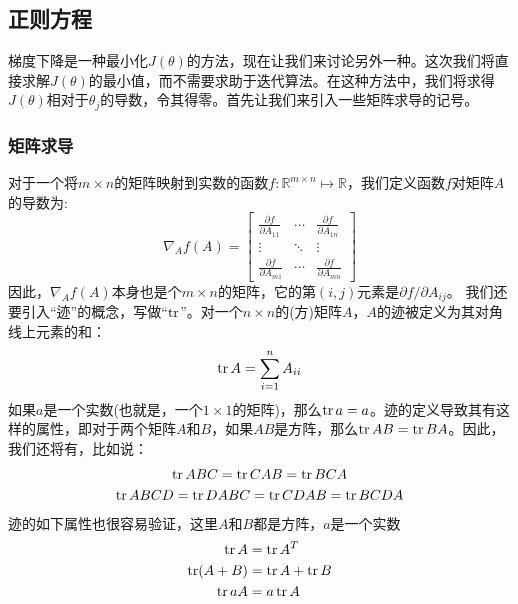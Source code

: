 \subsection{正则方程}
梯度下降是一种最小化$J(\theta)$的方法，现在让我们来讨论另外一种。这次我们将直接求解$J(\theta)$的最小值，而不需要求助于迭代算法。在这种方法中，我们将求得$J(\theta)$相对于$\theta_j$的导数，令其得零。首先让我们来引入一些矩阵求导的记号。

\subsubsection{矩阵求导}
对于一个将$m \times n$的矩阵映射到实数的函数$f:\mathbb R^{m \times n} \mapsto \mathbb R$，我们定义函数$f$对矩阵$A$的导数为:
\begin{equation}
\nabla_Af(A) = 
\begin{bmatrix}
\frac{\partial f}{\partial A_{11}} & \cdots & \frac{\partial f}{\partial A_{1n}} \\
\vdots & \ddots & \vdots \\
\frac{\partial f}{\partial A_{m1}} & \cdots & \frac{\partial f}{\partial A_{mn}}
\end{bmatrix}
\end{equation}
因此，$\nabla_Af(A)$本身也是个$m \times n$的矩阵，它的第$(i, j)$元素是$\partial f/\partial A_{ij}$。
我们还要引入“迹”的概念，写做``$\operatorname{tr}$''。对一个$n \times n$的(方)矩阵$A$，$A$的迹被定义为其对角线上元素的和：
\begin{equation}
\operatorname{tr} A = \sum_{i = 1}^nA_{ii}
\end{equation}
如果$a$是一个实数(也就是，一个$1 \times 1$的矩阵)，那么$\operatorname{tr} a = a$。迹的定义导致其有这样的属性，即对于两个矩阵$A$和$B$，如果$AB$是方阵，那么$\operatorname{tr} AB = \operatorname{tr} BA$。因此，我们还将有，比如说：
\begin{gather*}
\operatorname{tr} ABC = \operatorname{tr} CAB = \operatorname{tr} BCA \\
\operatorname{tr} ABCD = \operatorname{tr} DABC = \operatorname{tr} CDAB = \operatorname{tr} BCDA
\end{gather*}
迹的如下属性也很容易验证，这里$A$和$B$都是方阵，$a$是一个实数
\begin{align}
\operatorname{tr} A &= \operatorname{tr} A^T \\
\operatorname{tr} (A + B) &= \operatorname{tr} A + \operatorname{tr} B \\
\operatorname{tr} aA &= a\operatorname{tr} A
\end{align}
